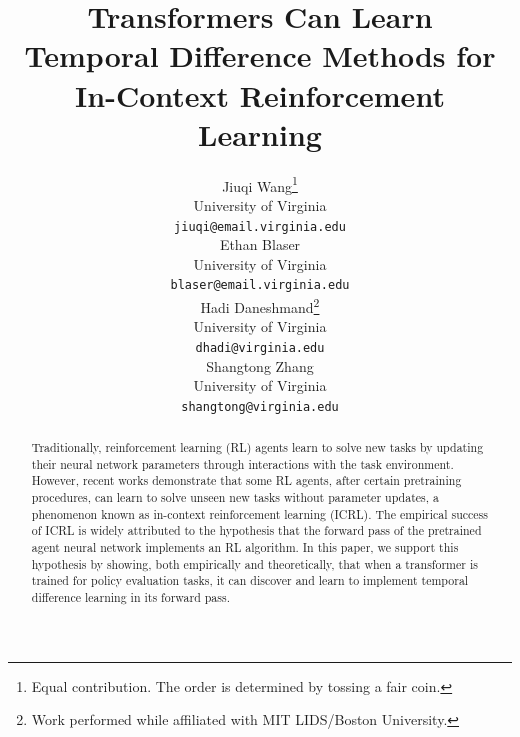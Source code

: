 \documentclass{article}
\title{Transformers Can Learn \\ Temporal Difference Methods for \\ In-Context  Reinforcement Learning}
\author{Jiuqi Wang\thanks{Equal contribution. The order is determined by tossing a fair coin.} \\
University of Virginia\\
\texttt{jiuqi@email.virginia.edu} \\
\And
Ethan Blaser\footnotemark[1] \\
University of Virginia \\
\texttt{blaser@email.virginia.edu} \\
\AND
Hadi Daneshmand\footnotemark[2]\thanks{Work performed while affiliated with MIT LIDS/Boston University.} \\
 University of Virginia\\
\texttt{dhadi@virginia.edu} \\
\And
Shangtong Zhang \\
University of Virginia \\
\texttt{shangtong@virginia.edu}}
\begin{document}
\maketitle
\begin{abstract}
Traditionally, reinforcement learning (RL) agents learn to solve new tasks by updating their neural network parameters through interactions with the task environment. However, recent works demonstrate that some RL agents, after certain pretraining procedures, can learn to solve unseen new tasks without parameter updates, a phenomenon known as in-context reinforcement learning (ICRL). The empirical success of ICRL is widely attributed to the hypothesis that the forward pass of the pretrained agent neural network implements an RL algorithm.
In this paper,
we support this hypothesis by showing, both empirically and theoretically,
that when a transformer is trained for policy evaluation tasks,
it can discover and learn to implement temporal difference learning in its forward pass.
\end{abstract}
\end{document}
